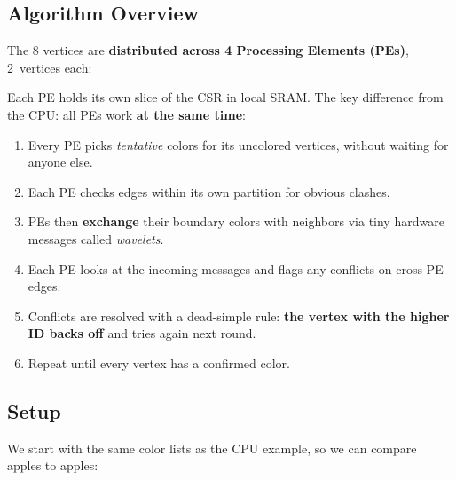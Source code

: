 \documentclass[11pt,letterpaper]{article}
\begin{document}
\subsection{Algorithm Overview}

The 8 vertices are \textbf{distributed across 4 Processing Elements (PEs)}, 2~vertices each:

\begin{center}
\end{center}

Each PE holds its own slice of the CSR in local SRAM. The key difference from the CPU: all PEs work \textbf{at the same time}:
\begin{enumerate}[nosep]
  \item Every PE picks \emph{tentative} colors for its uncolored vertices, without waiting for anyone else.
  \item Each PE checks edges within its own partition for obvious clashes.
  \item PEs then \textbf{exchange} their boundary colors with neighbors via tiny hardware messages called \emph{wavelets}.
  \item Each PE looks at the incoming messages and flags any conflicts on cross-PE edges.
  \item Conflicts are resolved with a dead-simple rule: \textbf{the vertex with the higher ID backs off} and tries again next round.
  \item Repeat until every vertex has a confirmed color.
\end{enumerate}

\subsection{Setup}

We start with the same color lists as the CPU example, so we can compare apples to apples:
\end{document}

